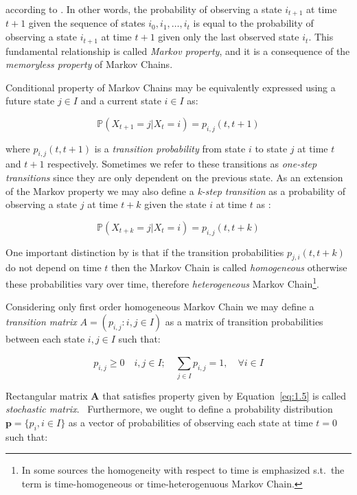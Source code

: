 according to \citep{Praskova2012}. In other words, the probability of observing a state $i_{t+1}$ at time $t+1$ given the sequence of states $i_0,i_1,\ldots,i_{t}$ is equal to the probability of observing a state $i_{t+1}$ at time $t+1$ given only the last observed state $i_t$.
This fundamental relationship is called \textit{Markov property}, and it is a consequence of the \textit{memoryless property} of Markov Chains.~\citep{Haggstrom2002}

Conditional property of Markov Chains may be equivalently expressed using a future state $j \in I$ and a current state $i \in I$ as:

\begin{equation}
    \mathbb{P}(X_{t+1}=j|X_t=i) = p_{i,j}(t,t+1)
\end{equation}

where $p_{i,j}(t,t+1)$ is a \textit{transition probability} from state $i$ to state $j$ at time $t$ and $t+1$ respectively. Sometimes we refer to these transitions as \textit{one-step transitions} since they are only dependent on the previous state.
As an extension of the Markov property we may also define a \textit{k-step transition} as a probability of observing a state $j$ at time $t+k$ given the state $i$ at time $t$ as \citep{Tolver2016}:

\begin{equation}
    \mathbb{P}(X_{t+k}=j|X_t=i) = p_{i,j}(t,t+k)
\end{equation}

One important distinction by \citep{Weinan2019} is that if the transition probabilities $p_{j,i}(t,t+k)$ do not depend on time $t$ then the Markov Chain is called \textit{homogeneous} otherwise these probabilities vary over time, therefore \textit{heterogeneous} Markov Chain\footnote{In some sources the homogeneity with respect to time is emphasized s.t.\ the term is time-homogeneous or time-heterogenuous Markov Chain.}.

Considering only first order homogeneous Markov Chain we may define a \textit{transition matrix} 
$A = (p_{i,j} : i,j \in I)$ as a matrix of transition probabilities between each state $i,j \in I$ such that:

\begin{equation} \label{eq:1.5}
    p_{i,j} \geq 0 \quad i,j \in I; \quad \sum\limits_{j \in I} ^{}p_{i,j} = 1, \quad \forall i \in I
\end{equation}

Rectangular matrix $\textbf{A}$ that satisfies property given by Equation~\ref{eq:1.5} is called \textit{stochastic matrix}.~\citep{Gagniuc2017}
Furthermore, we ought to define a probability distribution $\textbf{p} =\{p_i, i \in I\} $ as a vector of probabilities of observing each state at time $t=0$ such that:

